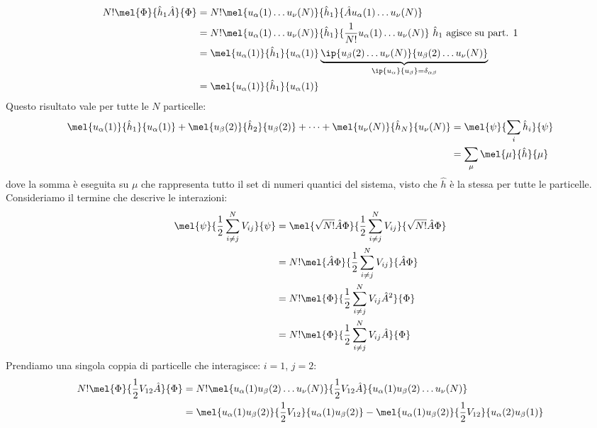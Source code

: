 \begin{equation*}
    \begin{aligned}
        N!\mel{\Phi}{\hat h_1\hat A}{\Phi}
        & = N!\mel{u_\alpha(1)\dots u_\nu(N)}{\hat h_1}{\hat A u_\alpha(1)\dots u_\nu(N)} \\
        & = N!\mel{u_\alpha(1)\dots u_\nu(N)}{\hat h_1}{\frac{1}{N!} u_\alpha(1)\dots u_\nu(N)}  \ \hat h_1 \text{ agisce su part. 1}\\
        & = \mel{u_\alpha(1)}{\hat h_1}{u_\alpha(1)}\underbrace{\ip{u_\beta(2)\dots u_\nu(N)}{u_\beta(2)\dots u_\nu(N)}}_{\ip{u_\alpha}{u_\beta}=\delta_{\alpha\beta}}\\
        & = \mel{u_\alpha(1)}{\hat h_1}{u_\alpha(1)} 
    \end{aligned}
\end{equation*}
Questo risultato vale per tutte le $N$ particelle:
\begin{equation*}
    \begin{aligned}
        \mel{u_\alpha(1)}{\hat h_1}{u_\alpha(1)} + \mel{u_\beta(2)}{\hat h_2}{u_\beta(2)} + \dots + \mel{u_\nu(N)}{\hat h_N}{u_\nu(N)} 
        & = \mel{\psi}{\sum_i \hat h_i}{\psi} \\
        & = \sum_\mu\mel{\mu}{\hat h}{\mu}
    \end{aligned}
\end{equation*}
dove la somma è eseguita su $\mu$ che rappresenta tutto il set di numeri quantici del sistema, visto che $\hat h$ è la stessa per tutte le particelle.\\
Consideriamo il termine che descrive le interazioni:
\begin{equation*}
    \begin{aligned}
    \mel{\psi}{\frac12\sum_{i\neq j}^N V_{ij}}{\psi}
    & =\mel{\sqrt{N!}\hat A \Phi}{\frac12\sum_{i\neq j}^N V_{ij}}{\sqrt{N!}\hat A \Phi} \\
    & =N!\mel{\hat A \Phi}{\frac12\sum_{i\neq j}^N V_{ij}}{\hat A \Phi} \\
    & =N!\mel{\Phi}{\frac12\sum_{i\neq j}^N V_{ij}\hat A^2}{\Phi} \\
    & =N!\mel{\Phi}{\frac12\sum_{i\neq j}^N V_{ij}\hat A}{\Phi} \\
    \end{aligned}
\end{equation*}
Prendiamo una singola coppia di particelle che interagisce: $i=1$, $j=2$:
\begin{equation*}
    \begin{aligned}
    N!\mel{\Phi}{\frac12 V_{12}\hat A}{\Phi}
    & = N!\mel{u_\alpha(1)u_\beta(2)\dots u_\nu(N)}{\frac12 V_{12}\hat A}{u_\alpha(1)u_\beta(2)\dots u_\nu(N)} \\
    & = \mel{u_\alpha(1)u_\beta(2)}{\frac 12 V_{12}}{u_\alpha(1)u_\beta(2)}-\mel{u_\alpha(1)u_\beta(2)}{\frac 12 V_{12}}{u_\alpha(2)u_\beta(1)}
    \end{aligned}
\end{equation*}
